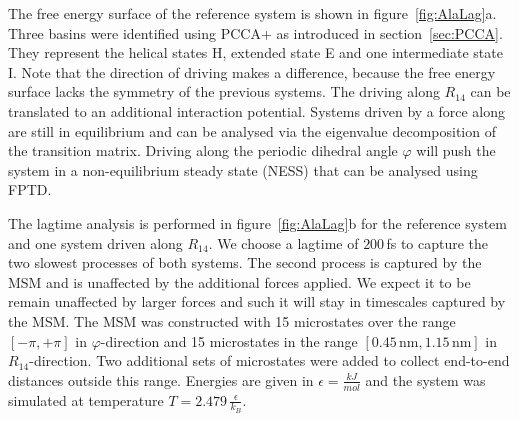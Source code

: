 The free energy surface of the reference system is shown in figure~\ref{fig:AlaLag}a. Three basins were identified using PCCA+ as introduced in section~\ref{sec:PCCA}. They represent the helical states H, extended state E and one intermediate state I. Note that the direction of driving makes a difference, because the free energy surface lacks the symmetry of the previous systems. The driving along $R_{14}$ can be translated to an additional interaction potential. Systems driven by a force along are still in equilibrium and can be analysed via the eigenvalue decomposition of the transition matrix. Driving along the periodic dihedral angle $\varphi$ will push the system in a non-equilibrium steady state (NESS) that can be analysed using FPTD. 

The lagtime analysis is performed in figure~\ref{fig:AlaLag}b for the reference system and one system driven along $R_{14}$. We choose a lagtime of $200\,$fs to capture the two slowest processes of both systems. The second process is captured by the MSM and is unaffected by the additional forces applied. We expect it to be remain unaffected by larger forces and such it will stay in timescales captured by the MSM. The MSM was constructed with 15 microstates over the range $[-\pi,+\pi]$ in $\varphi$-direction and 15 microstates in the range $[0.45\,\text{nm},1.15\,\text{nm}]$ in $R_{14}$-direction. Two additional sets of microstates were added to collect end-to-end distances outside this range. Energies are given in $\epsilon = \frac{kJ}{mol}$ and the system was simulated at temperature $T = 2.479\,\frac{\epsilon}{k_B}$.

\FloatBarrier
